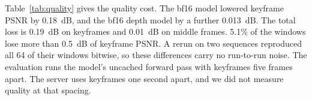 Table~\ref{tab:quality} gives the quality cost.
The bf16 model lowered keyframe PSNR by 0.18~dB, and the bf16 depth model by a further 0.013~dB. %
The total loss is 0.19~dB on keyframes and 0.01~dB on middle frames. %
5.1\% of the windows lose more than 0.5~dB of keyframe PSNR. %
A rerun on two sequences reproduced all 64 of their windows bitwise, so these differences carry no run-to-run noise. %
The evaluation runs the model's uncached forward pass with keyframes five frames apart. %
The server uses keyframes one second apart, and we did not measure quality at that spacing.
